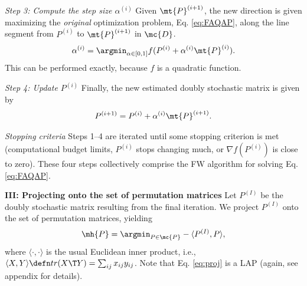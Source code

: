 \documentclass[10pt,journal,cspaper,compsoc]{IEEEtran}
\newcommand{\PmcP}{P \in \mc{P}}
\begin{document}
\emph{Step 3: Compute the step size $\alpha^{(i)}$} Given $\mt{P}^{(i+1)}$, the new direction is given maximizing the \emph{original} optimization problem, Eq. \eqref{eq:FAQAP}, along the line segment from $P^{(i)}$ to $\mt{P}^{(i+1)}$ in $\mc{D}$.    
% 
% 
% 
\begin{align}\label{eq:step}
	\alpha^{(i)} = \argmin_{\alpha \in [0,1]} f(P^{(i)} + \alpha^{(i)} \mt{P}^{(i)}).
\end{align}
This can be performed exactly, because $f$ is a quadratic function.  


\emph{Step 4: Update $P^{(i)}$} Finally, the new estimated doubly stochastic matrix is given by
\begin{align}\label{eq:update}
	P^{(i+1)} = P^{(i)} + \alpha^{(i)} \mt{P}^{(i+1)}.
\end{align}


\emph{Stopping criteria} Steps 1--4 are iterated until some stopping criterion is met (computational budget limits, $P^{(i)}$ stops changing much, or $\nabla f(P^{(i)})$ is close to zero).  These four steps collectively comprise the FW algorithm for solving Eq. \eqref{eq:FAQAP}.  %


\textbf{III: Projecting onto the set of permutation matrices}   Let $P^{(I)}$ be the doubly stochastic matrix resulting from the final iteration.  We project $P^{(I)}$ onto the set of permutation matrices, yielding
\begin{align} \label{eq:proj}
	\mh{P} = \argmin_{\PmcP} -\langle P^{(I)}, P \rangle,
\end{align}
where $\langle \cdot,\cdot \rangle$ %
is the usual Euclidean inner product, i.e., $\langle X,Y\rangle \defn tr(X\T Y)= \sum_{ij} x_{ij} y_{ij}$.  Note that Eq. \eqref{eq:proj} is a LAP (again, see appendix for details).
\end{document}

